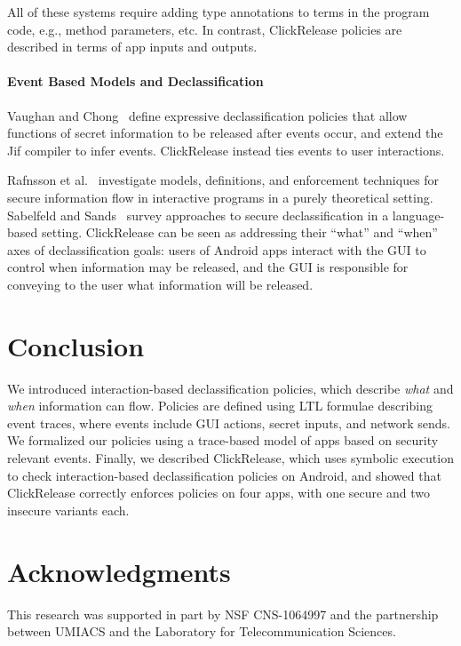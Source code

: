 \documentclass{llncs}
\newcommand{\toolname}{ClickRelease\xspace}
\begin{document}
All of these systems require adding type annotations to terms in the
program code, e.g., method parameters, etc. In contrast, \toolname{}
policies are described in terms of app inputs and
outputs.

\paragraph*{Event Based Models and Declassification}

Vaughan and Chong~\cite{Vaughan:2011} define expressive declassification policies that
allow functions of secret information to be released after events occur, and
extend the Jif compiler to infer events.  \toolname instead 
ties events to user interactions.

Rafnsson et al.~\cite{Rafnsson:12} investigate models, definitions, and enforcement
techniques for secure information flow in interactive programs in a
purely theoretical setting.
%
Sabelfeld and Sands~\cite{Sabelfeld:2009} survey approaches to
secure declassification in a language-based setting.  \toolname
can be seen as addressing their ``what'' and ``when'' axes of
declassification goals:  users of Android apps interact with the GUI
to control when information may be released, and the GUI is responsible
for conveying to the user what information will be released.

\section{Conclusion}
\label{sec:conclusion}

We introduced interaction-based declassification policies, which describe
\emph{what} and \emph{when} information can flow. Policies are defined
using LTL formulae describing event traces, where events include GUI
actions, secret inputs, and network sends. We formalized our policies
using a trace-based model of apps based on security relevant events.
Finally, we described \toolname{}, which uses symbolic
execution to check interaction-based declassification policies on Android, and
showed that \toolname{} correctly enforces policies on four apps,
with one secure and two insecure variants each.

\section*{Acknowledgments}

This research was supported in part by NSF CNS-1064997 and the
partnership between UMIACS and the Laboratory for Telecommunication
Sciences.



\end{document}
